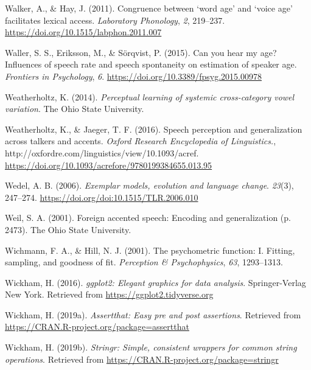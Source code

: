 \documentclass[
  11pt,
  english,
  man,floatsintext]{apa6}
\newlength{\cslhangindent}
\newlength{\cslentryspacingunit} %
\newenvironment{CSLReferences}[2] %
 {%
  \setlength{\parindent}{0pt}
  \ifodd #1
  \let\oldpar\par
  \def\par{\hangindent=\cslhangindent\oldpar}
  \fi
  \setlength{\parskip}{#2\cslentryspacingunit}
 }%
 {}
\begin{document}
\begin{CSLReferences}{1}{0}
\leavevmode{}%
Walker, A., \& Hay, J. (2011). Congruence between {`word age'} and {`voice age'} facilitates lexical access. \emph{Laboratory Phonology}, \emph{2}, 219--237. \url{https://doi.org/10.1515/labphon.2011.007}

\leavevmode{}%
Waller, S. S., Eriksson, M., \& Sörqvist, P. (2015). Can you hear my age? Influences of speech rate and speech spontaneity on estimation of speaker age. \emph{Frontiers in Psychology}, \emph{6}. \url{https://doi.org/10.3389/fpsyg.2015.00978}

\leavevmode{}%
Weatherholtz, K. (2014). \emph{Perceptual learning of systemic cross-category vowel variation}. The Ohio State University.

\leavevmode{}%
Weatherholtz, K., \& Jaeger, T. F. (2016). Speech perception and generalization across talkers and accents. \emph{Oxford Research Encyclopedia of Linguistics.}, http://oxfordre.com/linguistics/view/10.1093/acref. \url{https://doi.org/10.1093/acrefore/9780199384655.013.95}

\leavevmode{}%
Wedel, A. B. (2006). \emph{Exemplar models, evolution and language change}. \emph{23}(3), 247--274. \url{https://doi.org/doi:10.1515/TLR.2006.010}

\leavevmode{}%
Weil, S. A. (2001). Foreign accented speech: Encoding and generalization (p. 2473). The Ohio State University.

\leavevmode{}%
Wichmann, F. A., \& Hill, N. J. (2001). The psychometric function: I. Fitting, sampling, and goodness of fit. \emph{Perception \& Psychophysics}, \emph{63}, 1293--1313.

\leavevmode{}%
Wickham, H. (2016). \emph{ggplot2: Elegant graphics for data analysis}. Springer-Verlag New York. Retrieved from \url{https://ggplot2.tidyverse.org}

\leavevmode{}%
Wickham, H. (2019a). \emph{Assertthat: Easy pre and post assertions}. Retrieved from \url{https://CRAN.R-project.org/package=assertthat}

\leavevmode{}%
Wickham, H. (2019b). \emph{Stringr: Simple, consistent wrappers for common string operations}. Retrieved from \url{https://CRAN.R-project.org/package=stringr}


\end{CSLReferences}
\end{document}
